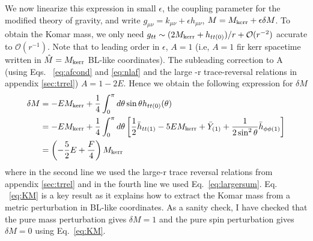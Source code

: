 \documentclass[aps,prd,amsmath,showpacs,amssymb,superscriptaddress,nofootinbib,longbibliography,eqsecnum,preprintnumbers]{revtex4-1}
\begin{document}
We now linearize this expression in small $\epsilon$, the coupling parameter for the modified theory of gravity, and write $g_{\mu \nu}=k_{\mu \nu}+ \epsilon h_{\mu \nu}$, $M= M_{\rm kerr} +\epsilon \delta M$. To obtain the Komar mass, we only need $g_{tt} \sim (2M_{\rm kerr}+h_{tt(0)})/r+\mathcal{O}(r^{-2})$ accurate to $\mathcal{O}(r^{-1})$. Note that to leading order in $\epsilon$, $A=1$ (i.e, $A=1$ fir kerr spacetime written in $\hat M =M_{\rm kerr}$ BL-like coordinates). The subleading correction to A (using Eqs.~ \eqref{eq:afcond} and \eqref{eq:nlaf} and the large -r trace-reversal relations in appendix \ref{sec:trrel})  $A=1-2E$. Hence we obtain the following expression for $\delta M$
\begin{align}
\delta M &=-E M_{\rm kerr}+\frac{1}{4}\int_{0}^\pi d\theta \sin\theta h_{tt(0)}(\theta) \nonumber \\
&=-E M_{\rm kerr}+\frac{1}{4}\int_{0}^\pi d\theta\left[\frac{1}{2}\bar h_{tt(1)}-5EM_{\rm kerr}+\bar Y_{(1)}+\frac{1}{2\sin^2\theta}\bar h_{\phi\phi(1)}\right] \nonumber \\
&=\left(-\frac{5}{2}E+\frac{F}{4}\right)M_{\rm kerr} \label{eq:KM}
\end{align}
where in the second line we used the large-r trace reversal relations from appendix \ref{sec:trrel} and in the fourth line we used Eq.~\eqref{eq:largersum}. Eq. ~\eqref{eq:KM} is a key result as it explains how to extract the Komar mass from a metric perturbation in BL-like coordinates. As a sanity check, I have checked that the pure mass perturbation gives $\delta M =1$ and the pure spin perturbation gives $\delta M=0$ using Eq.~\eqref{eq:KM}. 
\end{document}
